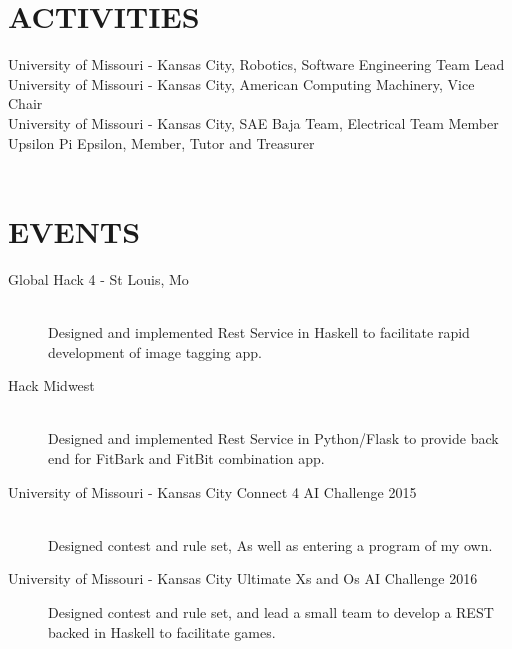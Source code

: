 \documentclass[margin,11pt]{res} %
\begin{document}
\begin{resume}
 
\section{ACTIVITIES}
University of Missouri - Kansas City, Robotics, Software Engineering Team Lead \\
University of Missouri - Kansas City, American Computing Machinery, Vice Chair \\
University of Missouri - Kansas City, SAE Baja Team, Electrical Team Member \\
Upsilon Pi Epsilon, Member, Tutor and Treasurer \\\
\section{EVENTS}
\begin{description}
\item [Global Hack 4 - St Louis, Mo] \hfill \\
   Designed and implemented Rest Service in Haskell to facilitate rapid development of image tagging app.

\item [Hack Midwest] \hfill \\
  Designed and implemented Rest Service in Python/Flask to provide back end for FitBark and FitBit combination app.

\item[University of Missouri - Kansas City Connect 4 AI Challenge 2015] \hfil \\ 
	Designed contest and rule set, As well as entering a program of my own.
\item[University of Missouri - Kansas City Ultimate Xs and Os AI Challenge 2016]
	Designed contest and rule set, and lead a small team to develop a REST backed in Haskell to facilitate games.  

\end{description}
\end{resume} 
\end{document}
